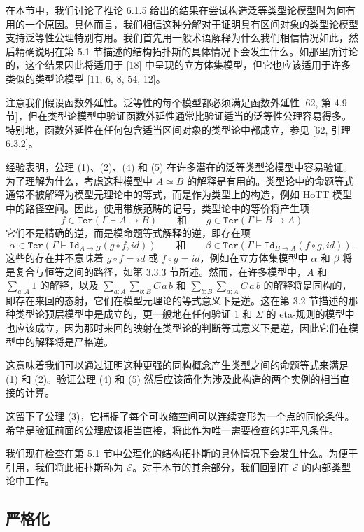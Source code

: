 \documentclass{ctexrep}
\theoremstyle{plain}
\theoremstyle{definition}
\theoremstyle{remark}
\begin{document}
在本节中，我们讨论了推论 6.1.5 给出的结果在尝试构造泛等类型论模型时为何有用的一个原因。具体而言，我们相信这种分解对于证明具有区间对象的类型论模型支持泛等性公理特别有用。我们首先用一般术语解释为什么我们相信情况如此，然后精确说明在第 5.1 节描述的结构拓扑斯的具体情况下会发生什么。如那里所讨论的，这个结果因此将适用于 [18] 中呈现的立方体集模型，但它也应该适用于许多类似的类型论模型 [11, 6, 8, 54, 12]。

注意我们假设函数外延性。泛等性的每个模型都必须满足函数外延性 [62, 第 4.9 节]，但在类型论模型中验证函数外延性通常比验证适当的泛等性公理容易得多。特别地，函数外延性在任何包含适当区间对象的类型论中都成立，参见 [62, 引理 6.3.2]。

经验表明，公理 (1)、(2)、(4) 和 (5) 在许多潜在的泛等类型论模型中容易验证。为了理解为什么，考虑这种模型中 $A \simeq B$ 的解释是有用的。类型论中的命题等式通常不被解释为模型元理论中的等式，而是作为类型上的构造，例如 HoTT 模型中的路径空间。因此，使用带族范畴的记号，类型论中的等价将产生项
\[
f \in \mathtt{Ter}(\Gamma \vdash A \to B) \qquad \text{和} \qquad g \in \mathtt{Ter}(\Gamma \vdash B \to A)
\]
它们不是精确的逆，而是模命题等式解释的逆，即存在项
\[
\alpha \in \mathtt{Ter}(\Gamma \vdash \mathtt{Id}_{A \to B}(g \circ f,  id )) \qquad \text{和} \qquad \beta \in \mathtt{Ter}(\Gamma \vdash \mathtt{Id}_{B \to A}(f \circ g,  id )).
\]
这些的存在并不意味着 $g \circ f =  id $ 或 $f \circ g =  id $，例如在立方体集模型中 $\alpha$ 和 $\beta$ 将是复合与恒等之间的路径，如第 3.3.3 节所述。然而，在许多模型中，$A$ 和 $\sum_{a:A} 1$ 的解释，以及 $\sum_{a:A}\sum_{b:B} C\,a\,b$ 和 $\sum_{b:B}\sum_{a:A} C\,a\,b$ 的解释将是同构的，即存在来回的态射，它们在模型元理论的等式意义下是逆。这在第 3.2 节描述的那种类型论预层模型中是成立的，更一般地在任何验证 1 和 $\Sigma$ 的 eta-规则的模型中也应该成立，因为那时来回的映射在类型论的判断等式意义下是逆，因此它们在模型中的解释将是严格逆。

这意味着我们可以通过证明这种更强的同构概念产生类型之间的命题等式来满足 (1) 和 (2)。验证公理 (4) 和 (5) 然后应该简化为涉及此构造的两个实例的相当直接的计算。

这留下了公理 (3)，它捕捉了每个可收缩空间可以连续变形为一个点的同伦条件。希望是验证前面的公理应该相当直接，将此作为唯一需要检查的非平凡条件。

我们现在检查在第 5.1 节中公理化的结构拓扑斯的具体情况下会发生什么。为便于引用，我们将此拓扑斯称为 $\mathcal{E}$。对于本节的其余部分，我们回到在 $\mathcal{E}$ 的内部类型论中工作。

\subsection{严格化}
\end{document}
